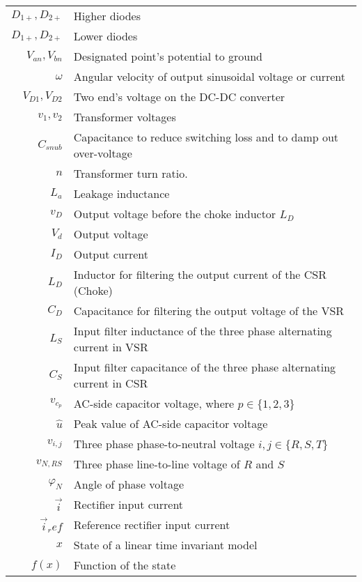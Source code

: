 \begin{scriptsize}
\begin{tabularx}{\textwidth}{r|X}
	$D_{1+},D_{2+}$										& Higher diodes\\
	$D_{1+},D_{2+}$										& Lower diodes\\
	$V_{an},V_{bn}$  									& Designated point's potential to ground \\
	$\omega$													& Angular velocity of output sinusoidal voltage or current\\
	$V_{D1},V_{D2}$ 									& Two end's voltage on the DC-DC converter\\
	$v_1,v_2$                         & Transformer voltages\\
	$C_{snub}$ 												& Capacitance to reduce switching loss and to damp out over-voltage\\
	$n$ 															& Transformer turn ratio.\\
	$L_a$															& Leakage inductance\\
	$v_D$															& Output voltage before the choke inductor $L_D$\\
	$V_d$															& Output voltage\\
	$I_D$															& Output current\\
	$L_D$															& Inductor for filtering the output current of the CSR (Choke)\\
	$C_D$															& Capacitance for filtering the output voltage of the VSR\\
	$L_S$															& Input filter inductance of the three phase alternating current in VSR\\
	$C_S$															& Input filter capacitance of the three phase alternating current in CSR\\
	$v_{c_p}$													& AC-side capacitor voltage, where $p\in\{1,2,3\}$\\
	$\widehat{u}$											& Peak value of AC-side capacitor voltage\\
	$v_{i,j}$													& Three phase phase-to-neutral voltage $i,j\in\{R,S,T\}$\\
	$v_{N,RS}$												& Three phase line-to-line voltage of $R$ and $S$\\
	$\varphi_N$												& Angle of phase voltage\\
	$\vec{i}$													& Rectifier input current\\
	$\vec{i}_ref$											& Reference rectifier input current\\
	$x$																& State of a linear time invariant model\\
	$f(x)$														& Function of the state\\

\end{tabularx}
\end{scriptsize}
